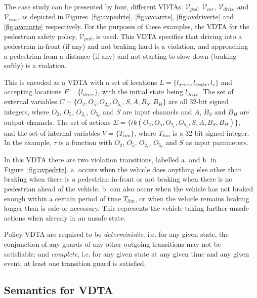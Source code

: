 \begin{example}
	The case study can be presented by four, different \acp{VDTA}; $\mathcal{V}_{ped}$, $\mathcal{V}_{car}$, $\mathcal{V}_{drive}$ and $\mathcal{V}_{cnn}$, as depicted in Figures~\ref{fig:avpedrte}, \ref{fig:avcarrte}, \ref{fig:avdriverte} and \ref{fig:avcnnrte} respectively. 
	For the purposes of these examples, the \ac{VDTA} for the pedestrian safety policy, $\mathcal{V}_{ped}$, is used.
	This \ac{VDTA} specifies that driving into a pedestrian in-front (if any) and not braking hard is a violation, and approaching a pedestrian from a distance (if any) and not starting to slow down (braking softly) is a violation.
	
	This is encoded as a \ac{VDTA} with a set of locations $L = \{l_{drive}, l_{brake}, l_v\}$ and accepting locations $F = \{l_{drive}\}$, with the initial state being $l_{drive}$.
	The set of external variables $C = \{O_2, O_5, O_{2_v}, O_{5_v}, S, A, B_S, B_H\}$ are all 32-bit signed integers, where $O_2$, $O_5$, $O_{2_v}$, $O_{5_v}$ and $S$ are input channels and $A$, $B_S$ and $B_H$ are output channels.
	The set of actions $\Sigma = \{tk(O_2, O_5, O_{2_v}, O_{5_v}, S, A, B_S, B_H)\}$, and the set of internal variables $V = \{T_{lim}\}$, where $T_{lim}$ is a 32-bit signed integer.
	In the example, $\tau$ is a function with $O_2$, $O_5$, $O_{2_v}$, $O_{5_v}$ and $S$ as input parameters. 
	
	In this \ac{VDTA} there are two violation transitions, labelled \textcircled{a} and \textcircled{b} in Figure~\ref{fig:avpedrte}.
	\textcircled{a} occurs when the vehicle does anything else other than braking when there is a pedestrian in-front or not braking when there is no pedestrian ahead of the vehicle.
	\textcircled{b} can also occur when the vehicle has not braked enough within a certain period of time $T_{lim}$, or when the vehicle remains braking longer than is safe or necessary.
	This represents the vehicle taking further unsafe actions when already in an unsafe state.
\end{example}

Policy \ac{VDTA} are required to be \textit{deterministic}, i.e. for any given state, the conjunction of any guards of any other outgoing transitions may not be satisfiable; and \textit{complete}, i.e. for any given state at any given time and any given event, at least one transition guard is satisfied.

\subsection{Semantics for \ac{VDTA}}

